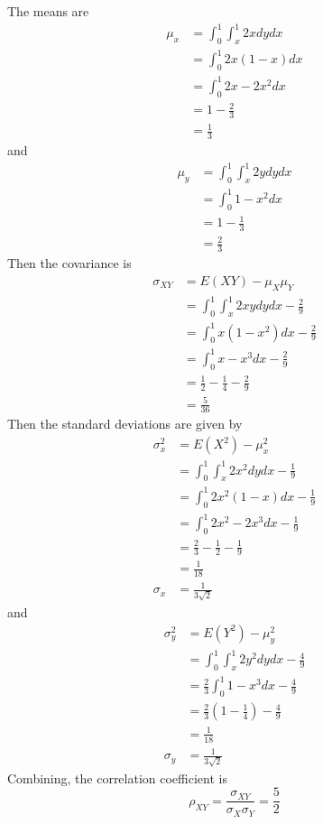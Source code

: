 \documentclass[answers]{exam}
\begin{document}
\begin{questions}

\begin{solution}
	The means are
	\begin{align*}
		\mu_x &= \int_0^1 \int_x^1 2x dydx \\
		      &= \int_0^1 2x(1-x)dx \\
		      &= \int_0^1 2x - 2x^2 dx \\
		      &= 1 - \frac{2}{3} \\
		      &= \frac{1}{3}
	\end{align*}
	and
	\begin{align*}
		\mu_y &= \int_0^1 \int_x^1 2ydydx \\
		      &= \int_0^1 1 - x^2 dx \\
		      &= 1 - \frac{1}{3} \\
		      &= \frac{2}{3}
	\end{align*}
	Then the covariance is
	\begin{align*}
		\sigma_{XY} &= E(XY) - \mu_X\mu_Y \\
			    &= \int_0^1 \int_x^1 2xydydx - \frac{2}{9} \\
			    &= \int_0^1 x(1-x^2)dx - \frac{2}{9} \\
			    &= \int_0^1 x - x^3 dx - \frac{2}{9} \\
			    &= \frac{1}{2} - \frac{1}{4} - \frac{2}{9} \\
			    &= \frac{5}{36}
	\end{align*}
	Then the standard deviations are given by
	\begin{align*}
		\sigma_x^2 &= E(X^2) - \mu_x^2 \\
			   &= \int_0^1 \int_x^1 2x^2 dydx - \frac{1}{9} \\
			   &= \int_0^1 2x^2(1-x)dx - \frac{1}{9} \\
			   &= \int_0^1 2x^2 - 2x^3 dx - \frac{1}{9} \\
			   &= \frac{2}{3} - \frac{1}{2} - \frac{1}{9} \\
			   &= \frac{1}{18} \\
		\sigma_x &= \frac{1}{3\sqrt{2}}
	\end{align*}
	and
	\begin{align*}
		\sigma_y^2 &= E(Y^2) - \mu_y^2 \\
			   &= \int_0^1 \int_x^1 2y^2 dydx - \frac{4}{9} \\
			   &= \frac{2}{3} \int_0^1 1 - x^3 dx - \frac{4}{9} \\
			   &= \frac{2}{3}(1 - \frac{1}{4}) - \frac{4}{9} \\
			   &= \frac{1}{18} \\
		\sigma_y &= \frac{1}{3\sqrt{2}}
	\end{align*}
	Combining, the correlation coefficient is
	$$\rho_{XY} = \frac{\sigma_{XY}}{\sigma_X\sigma_Y} = \frac{5}{2}$$
\end{solution}


\end{questions}
\end{document}
